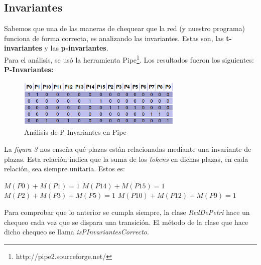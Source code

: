 \documentclass{article}
\begin{document}
    \subsection{Invariantes}
    \begin{flushleft}
        Sabemos que una de las maneras de chequear que la red (y nuestro programa) funciona 
        de forma correcta, es analizando las invariantes. Estas son, las \textbf{t-invariantes}
        y las \textbf{p-invariantes}. \\
        Para el análisis, se usó la herramienta Pipe\footnote{http://pipe2.sourceforge.net/}.
        Los resultados fueron los siguientes: \newline \newline
        \textbf{P-Invariantes:} \\
        \begin{figure}[h]
            \includegraphics[width=0.7\textwidth, center]{p-invariante.png}
            \caption{Análisis de P-Invariantes en Pipe}
        \end{figure}
        La \emph{figura 3} nos enseña qué plazas están relacionadas mediante una invariante de
        plazas. Esta relación indica que la suma de los \emph{tokens} en dichas plazas, en cada
        relación, sea siempre unitaria. Estos es: \newline \newline
        \begin{center}
            $M(P0) + M(P1) = 1$ \newline \newline
            $M(P14) + M(P15) = 1$ \newline \newline
            $M(P2) + M(P3) + M(P5) = 1$ \newline \newline
            $M(P10) + M(P12) + M(P9) = 1$ \newline \newline
        \end{center}
        Para comprobar que lo anterior se cumpla siempre, la clase \emph{RedDePetri} hace un 
        chequeo cada vez que se dispara una transición. El método de la clase que hace dicho
        chequeo se llama \emph{isPInvariantesCorrecto}. \newline \newline

\end{flushleft}
\end{document}
